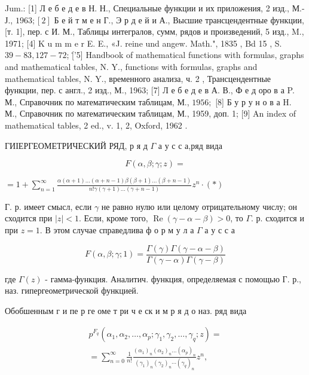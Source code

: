 \documentclass[10pt]{article}
\begin{document}
Jum.: [1] Л е б е д е в Н. Н., Специальные функции и их приложения, 2 изд., М.-Ј., $1963 ;[2]$ Б е й т м е н Г., Э р д е й и А., Высшие трансцендентные функции, [т. 1], пер. с И. М., Таблицы интегралов, сумм, рядов и произведений, 5 изд., M., 1971; [4] K u m m e r E. E., «J. reine und angew. Math.", 1835 , Bd 15 , S. $39-83,127-72$; [̇'5] Handbook of mathematical functions with formulas, graphs and mathematical tables, N. Y., functions with formulas, graphs and mathematical tables, N. Y., временного анализа, ч. 2 , Трансцендентные функции, пер. с англ., 2 изд., М., 1963; [7] Л е б е д е в А. В., Ф е д оро в а P. М., Справочник по математическим таблицам, М., $1956 ;$ [8] Б у р у н о в а H. М., Справочник по математическим таблицам, М., 1959, доп. 1; [9] An index of mathematical tables, 2 ed., v. 1, 2, Oxford, 1962 .



ГИІЕРГЕОМЕТРИЧЕСКИЙ РЯД, р я д $\Gamma$ а у с с а,ряд вида



\[

F(\alpha, \beta ; \gamma ; z)=

\]



$=1+\sum_{n=1}^{\infty} \frac{\alpha(\alpha+1) \ldots(\alpha+n-1) \beta(\beta+1) \ldots(\beta+n-1)}{n ! \gamma(\gamma+1) \ldots(\gamma+n-1)} z^{n} \cdot(*)$



Г. р. имеет смысл, если $\gamma$ не равно нулю или целому отрицательному числу; он сходится при $|z|<1$. Если, кроме того, $\operatorname{Re}(\gamma-\alpha-\beta)>0$, то $\Gamma$. р. сходится и при $z=1$. В этом случае справедлива ф о р м у л а $\Gamma$ а у с с а



\[

F(\alpha, \beta ; \gamma ; 1)=\frac{\Gamma(\gamma) \Gamma(\gamma-\alpha-\beta)}{\Gamma(\gamma-\alpha) \Gamma(\gamma-\beta)}

\]



где $\Gamma(z)$ - гамма-функция. Аналитич. функция, определяемая с помощью Г. р., наз. гипергеометрической функцией.



Обобшенным г и пе р ге оме т ри ч е ск и м р я д о наз. ряд вида



\[

\begin{gathered}

p^{F_{q}}\left(\alpha_{1}, \alpha_{2}, \ldots, \alpha_{p} ; \gamma_{1}, \gamma_{2}, \ldots, \gamma_{q} ; z\right)= \\

=\sum_{n=0}^{\infty} \frac{1}{n !} \frac{\left(\alpha_{1}\right)_{n}\left(\alpha_{2}\right)_{n} \ldots\left(\alpha_{p}\right)_{n}}{\left(\gamma_{1}\right)_{n}\left(\gamma_{2}\right)_{n} \cdots\left(\gamma_{q}\right)_{n}} z^{n},

\end{gathered}

\]
\end{document}
